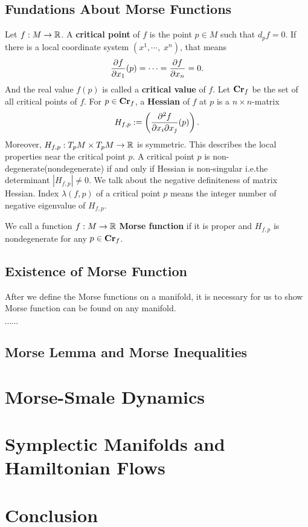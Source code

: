 \documentclass{jnuthesis}
\begin{document}
\section{Fundations About Morse Functions}
Let $f:M \rightarrow \mathbb{R}$.
A \textbf{critical point} of $f$ is the point $p\in M$ such that $d_p f = 0$.
If there is a local coordinate system $(x^1,\cdots,\; x^n)$, that means 
\begin{align*}
  \frac{\partial f}{\partial x_1}(p)=\cdots=\frac{\partial f}{\partial x_n}=0.
\end{align*}
And the real value $f(p)$ is called a \textbf{critical value} of $f$.
Let $\textbf{Cr}_f$ be the set of all critical points of $f$.
For $p\in \textbf{Cr}_f$, a \textbf{Hessian} of $f$ at $p$ is a $n\times n$-matrix
\[H_{f,p}:=\left(\frac{\partial^2 f}{\partial x_i \partial x_j}(p)\right).\]
Moreover, $H_{f,p}:T_pM\times T_pM \rightarrow \mathbb{R}$ is symmetric.
This describes the local properties near the critical point $p$.
A critical point $p$ is non-degenerate(nondegenerate) if and only if Hessian is non-singular
i.e.the determinant $|H_{f,p}| \neq 0$.
We talk about the negative definiteness of matrix Hessian.
Index $\lambda(f,p)$ of a critical point $p$ means the integer number of negative eigenvalue of $H_{f,p}$. 

We call a function $f:M \rightarrow \mathbb{R}$ \textbf{Morse function} if it is proper and $H_{f,p}$ is nondegenerate
for any $p \in \textbf{Cr}_f$.

\section{Existence of Morse Function}
After we define the Morse functions on a manifold, it is necessary for us to show Morse function can be found on any manifold.

$\cdots\cdots$


\section{Morse Lemma and Morse Inequalities}

\chapter{Morse-Smale Dynamics}

\chapter{Symplectic Manifolds and Hamiltonian Flows}

\chapter{Conclusion}
\end{document}
